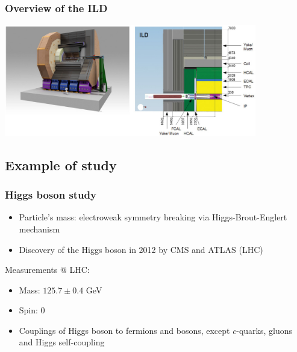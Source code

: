 \documentclass{beamer}
\begin{document}
\begin{frame}
    \frametitle{Overview of the ILD}

    \begin{center}
        \includegraphics[width = 11cm]{Pictures/ild-detector-ilc.jpg}
    \end{center}
\end{frame}

  \subsection{Example of study}

    \begin{frame}
      \frametitle{Higgs boson study}
      \begin{itemize}
        \item Particle's mass: electroweak symmetry breaking via Higgs-Brout-Englert mechanism
        \item Discovery of the Higgs boson in 2012 by CMS and ATLAS (LHC)
      \end{itemize}
      \begin{block}{Measurements @ LHC:}
        \begin{itemize}
          \item Mass: $125.7 \pm 0.4$ GeV
          \item Spin: 0
          \item Couplings of Higgs boson to fermions and bosons, except $c$-quarks, gluons and Higgs self-coupling
        \end{itemize}
      \end{block}
    \end{frame}
\end{document}
